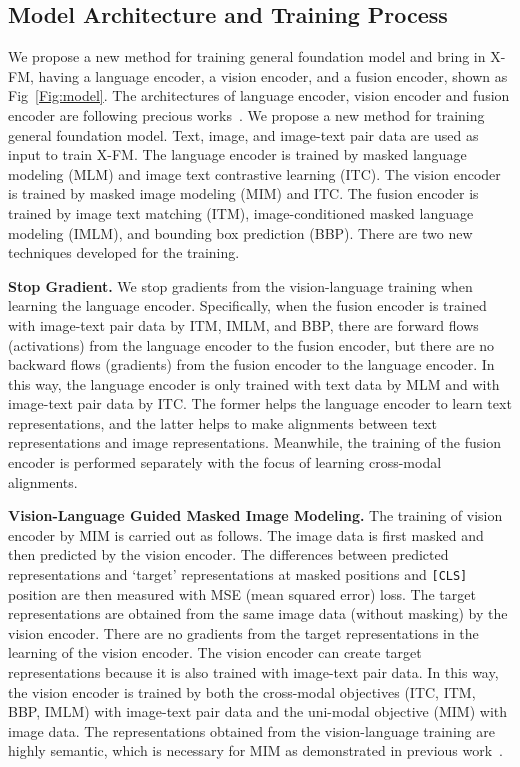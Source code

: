 \documentclass[11pt]{article}
\newcommand{\ModelName}{X-FM\xspace}
\begin{document}
\subsection{Model Architecture and Training Process}
\label{sec:model_arc}
We propose a new method for training general foundation model and bring in {\ModelName}, having a language encoder, a vision encoder,  and a fusion encoder, shown as Fig~\ref{Fig:model}. The architectures of language encoder, vision encoder and fusion encoder are following precious works~\citep{devlin2018bert,dosovitskiy2020image,li2021align}. We propose a new method for training general foundation model. Text, image, and image-text pair data are used as input to train {\ModelName}. The language encoder is trained by masked language modeling (MLM) and image text contrastive learning (ITC). The vision encoder is trained by masked image modeling (MIM) and ITC. The fusion encoder is trained by image text matching (ITM), image-conditioned masked language modeling (IMLM), and bounding box prediction (BBP). There are two new techniques developed for the training.
 




{\bf Stop Gradient.} We stop gradients from the vision-language training when learning the language encoder. Specifically, when the fusion encoder is trained with image-text pair data by ITM, IMLM, and BBP, there are forward flows (activations) from the language encoder to the fusion encoder, but there are no backward flows (gradients) from the fusion encoder to the language encoder. In this way, the language encoder is only trained with text data by MLM and with image-text pair data by ITC. The former helps the language encoder to learn text representations, and the latter helps to make alignments between text representations and image representations. Meanwhile, the training of the fusion encoder is performed separately with the focus of learning cross-modal alignments.


{\bf Vision-Language Guided Masked Image Modeling.} The training of vision encoder by MIM is carried out as follows. The image data is first masked and then predicted by the vision encoder. The differences between predicted representations and `target' representations at masked positions and \texttt{[CLS]} position are then measured with MSE (mean squared error) loss. The target representations are obtained from the same image data (without masking) by the vision encoder. There are no gradients from the target representations in the learning of the vision encoder. The vision encoder can create target representations because it is also trained with image-text pair data. In this way, the vision encoder is trained by both the cross-modal objectives (ITC, ITM, BBP, IMLM) with image-text pair data and the uni-modal objective (MIM) with image data. The representations obtained from the vision-language training are highly semantic, which is necessary for MIM as demonstrated in previous work~\citep{bao2021beit,peng2022beit,wei2022masked,wei2022mvp}.
\end{document}
